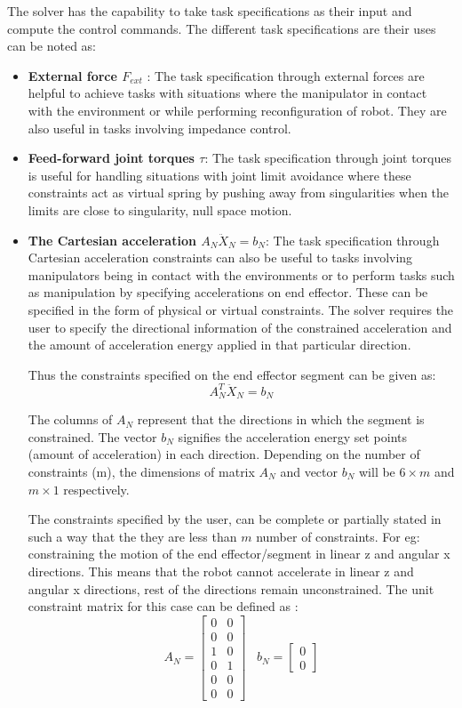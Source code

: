 The solver has the capability to take task specifications as their input and compute the control commands. The different task specifications are their uses can be noted as:
\begin{itemize}
		\item \textbf{External force $F_{ext}$} : The task specification through external forces are helpful to achieve tasks with situations where the manipulator in contact with the environment or while performing reconfiguration of robot. They are also useful in tasks involving impedance control.
		\item \textbf{Feed-forward joint torques $\tau$}: The task specification through joint torques is useful for handling situations with joint limit avoidance where these constraints act as virtual spring by pushing away from singularities when the limits are close to singularity, null space motion.
\item \textbf{The Cartesian acceleration $A_{N}\ddot{X}_{N} = b_{N}$}: The task specification through Cartesian acceleration constraints can also be useful to tasks involving manipulators being in contact with the environments or to perform tasks such as manipulation by specifying accelerations on end effector. These can be specified in the form of physical or virtual constraints. The solver requires the user to specify the directional information of the constrained acceleration and the amount of acceleration energy applied in that particular direction.


Thus the constraints specified on the end effector segment can be given as: ~\cite{shakhimardanov2015composable} 
	\begin{equation}
	A_{N}^{T}\ddot{X}_{N} = b_{N}
	\end{equation} 
	
	
The columns of $A_{N}$ represent that the directions in which the segment is constrained. The vector $b_{N}$ signifies the acceleration energy set points (amount of acceleration) in each direction. Depending on the number of constraints (m), the dimensions of matrix $A_{N}$ and vector $b_{N}$ will be $6\times m$ and $m\times 1$ respectively.
	
	
The constraints specified by the user, can be complete or partially stated in such a way that the they are less than $m$ number of constraints. For eg: constraining the motion of the end effector/segment in linear z and angular x directions. This means that the robot cannot accelerate in linear z and angular x directions, rest of the directions remain unconstrained. The unit constraint matrix for this case can be defined as \cite{shakhimardanov2015composable}:
	\[A_{N} =
	\begin{bmatrix}
	0 & 0 \\ 0 & 0 \\ 1 & 0 \\ 0 & 1 \\ 0 & 0 \\ 0 & 0
	\end{bmatrix} \;\;\;
	b_{N} =
	\begin{bmatrix}
	0 \\ 0
	\end{bmatrix}
	\]
	

\end{itemize}
